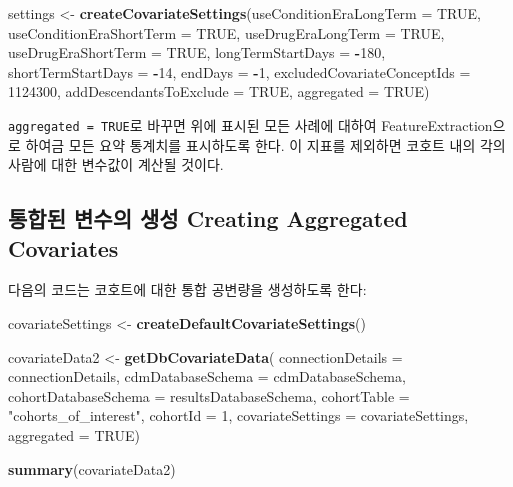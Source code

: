 \documentclass[10.5pt]{book}
\newenvironment{Shaded}{\begin{snugshade}}{\end{snugshade}}
\newcommand{\KeywordTok}[1]{\textcolor[rgb]{0.13,0.29,0.53}{\textbf{#1}}}
\newcommand{\DataTypeTok}[1]{\textcolor[rgb]{0.13,0.29,0.53}{#1}}
\newcommand{\DecValTok}[1]{\textcolor[rgb]{0.00,0.00,0.81}{#1}}
\newcommand{\StringTok}[1]{\textcolor[rgb]{0.31,0.60,0.02}{#1}}
\newcommand{\OtherTok}[1]{\textcolor[rgb]{0.56,0.35,0.01}{#1}}
\newcommand{\OperatorTok}[1]{\textcolor[rgb]{0.81,0.36,0.00}{\textbf{#1}}}
\newcommand{\NormalTok}[1]{#1}
\theoremstyle{definition}
\theoremstyle{definition}
\theoremstyle{definition}
\theoremstyle{remark}
\let\BeginKnitrBlock\begin \let\EndKnitrBlock\end
\begin{document}
\begin{Shaded}
\begin{Highlighting}[]
\NormalTok{settings <-}\StringTok{ }\KeywordTok{createCovariateSettings}\NormalTok{(}\DataTypeTok{useConditionEraLongTerm =} \OtherTok{TRUE}\NormalTok{, }
                                    \DataTypeTok{useConditionEraShortTerm =} \OtherTok{TRUE}\NormalTok{, }
                                    \DataTypeTok{useDrugEraLongTerm =} \OtherTok{TRUE}\NormalTok{, }
                                    \DataTypeTok{useDrugEraShortTerm =} \OtherTok{TRUE}\NormalTok{, }
                                    \DataTypeTok{longTermStartDays =} \OperatorTok{-}\DecValTok{180}\NormalTok{, }
                                    \DataTypeTok{shortTermStartDays =} \OperatorTok{-}\DecValTok{14}\NormalTok{, }
                                    \DataTypeTok{endDays =} \OperatorTok{-}\DecValTok{1}\NormalTok{, }
                                    \DataTypeTok{excludedCovariateConceptIds =} \DecValTok{1124300}\NormalTok{, }
                                    \DataTypeTok{addDescendantsToExclude =} \OtherTok{TRUE}\NormalTok{, }
                                    \DataTypeTok{aggregated =} \OtherTok{TRUE}\NormalTok{) }
\end{Highlighting}
\end{Shaded}

\BeginKnitrBlock{rmdimportant}
\texttt{aggregated\ =\ TRUE}로 바꾸면 위에 표시된 모든 사례에 대하여
FeatureExtraction으로 하여금 모든 요약 통계치를 표시하도록 한다. 이
지표를 제외하면 코호트 내의 각의 사람에 대한 변수값이 계산될 것이다.
\EndKnitrBlock{rmdimportant}

\subsection{통합된 변수의 생성 Creating Aggregated
Covariates}\label{---creating-aggregated-covariates}

다음의 코드는 코호트에 대한 통합 공변량을 생성하도록 한다:

\begin{Shaded}
\begin{Highlighting}[]
\NormalTok{covariateSettings <-}\StringTok{ }\KeywordTok{createDefaultCovariateSettings}\NormalTok{() }

\NormalTok{covariateData2 <-}\StringTok{ }\KeywordTok{getDbCovariateData}\NormalTok{(}
  \DataTypeTok{connectionDetails =}\NormalTok{ connectionDetails, }
  \DataTypeTok{cdmDatabaseSchema =}\NormalTok{ cdmDatabaseSchema, }
  \DataTypeTok{cohortDatabaseSchema =}\NormalTok{ resultsDatabaseSchema, }
  \DataTypeTok{cohortTable =} \StringTok{"cohorts_of_interest"}\NormalTok{, }
  \DataTypeTok{cohortId =} \DecValTok{1}\NormalTok{, }
  \DataTypeTok{covariateSettings =}\NormalTok{ covariateSettings, }
  \DataTypeTok{aggregated =} \OtherTok{TRUE}\NormalTok{) }

\KeywordTok{summary}\NormalTok{(covariateData2) }
\end{Highlighting}
\end{Shaded}
\end{document}
